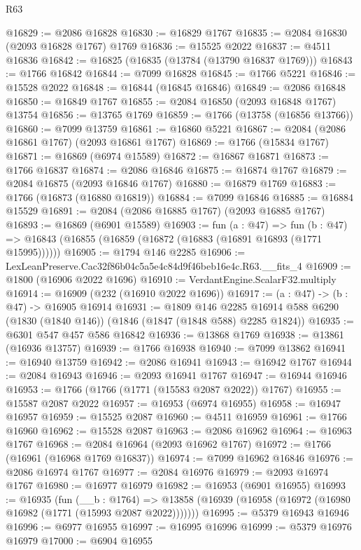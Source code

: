 \begin{lexlean}{R63}
\begin{coremodule}
@16829 := @2086 @16828
@16830 := @16829 @1767
@16835 := @2084 @16830 (@2093 @16828 @1767) @1769
@16836 := @15525 @2022
@16837 := @4511 @16836
@16842 := @16825 (@16835 (@13784 (@13790 @16837 @1769)))
@16843 := @1766 @16842
@16844 := @7099 @16828
@16845 := @1766 @5221
@16846 := @15528 @2022
@16848 := @16844 (@16845 @16846)
@16849 := @2086 @16848
@16850 := @16849 @1767
@16855 := @2084 @16850 (@2093 @16848 @1767) @13754
@16856 := @13765 @1769
@16859 := @1766 (@13758 (@16856 @13766))
@16860 := @7099 @13759
@16861 := @16860 @5221
@16867 := @2084 (@2086 @16861 @1767) (@2093 @16861 @1767)
@16869 := @1766 (@15834 @1767)
@16871 := @16869 (@6974 @15589)
@16872 := @16867 @16871
@16873 := @1766 @16837
@16874 := @2086 @16846
@16875 := @16874 @1767
@16879 := @2084 @16875 (@2093 @16846 @1767)
@16880 := @16879 @1769
@16883 := @1766 (@16873 (@16880 @16819))
@16884 := @7099 @16846
@16885 := @16884 @15529
@16891 := @2084 (@2086 @16885 @1767) (@2093 @16885 @1767)
@16893 := @16869 (@6901 @15589)
@16903 := fun (a : @47) =>
  fun (b : @47) => @16843 (@16855 (@16859 (@16872 (@16883 (@16891 @16893 (@1771 @15995))))))
@16905 := @1794 @146 @2285
@16906 := LexLeanPreserve.Cac32f86b04c5a5e4c84d9f46beb16e4c.R63.__fits_4
@16909 := @1800 (@16906 @2022 @1696)
@16910 := VerdantEngine.ScalarF32.multiply
@16914 := @16909 (@232 (@16910 @2022 @1696))
@16917 := (a : @47) -> (b : @47) -> @16905 @16914
@16931 := @1809
    @146
    @2285
    @16914
    @588
    @6290
    (@1830 (@1840 @146))
    (@1846 (@1847 (@1848 @588) @2285 @1824))
@16935 := @6301 @547 @457 @586 @16842
@16936 := @13868 @1769
@16938 := @13861 (@16936 @13757)
@16939 := @1766 @16938
@16940 := @7099 @13862
@16941 := @16940 @13759
@16942 := @2086 @16941
@16943 := @16942 @1767
@16944 := @2084 @16943
@16946 := @2093 @16941 @1767
@16947 := @16944 @16946
@16953 := @1766 (@1766 (@1771 (@15583 @2087 @2022)) @1767)
@16955 := @15587 @2087 @2022
@16957 := @16953 (@6974 @16955)
@16958 := @16947 @16957
@16959 := @15525 @2087
@16960 := @4511 @16959
@16961 := @1766 @16960
@16962 := @15528 @2087
@16963 := @2086 @16962
@16964 := @16963 @1767
@16968 := @2084 @16964 (@2093 @16962 @1767)
@16972 := @1766 (@16961 (@16968 @1769 @16837))
@16974 := @7099 @16962 @16846
@16976 := @2086 @16974 @1767
@16977 := @2084 @16976
@16979 := @2093 @16974 @1767
@16980 := @16977 @16979
@16982 := @16953 (@6901 @16955)
@16993 := @16935
    (fun (__b : @1764) =>
    @13858 (@16939 (@16958 (@16972 (@16980 @16982 (@1771 (@15993 @2087 @2022)))))))
@16995 := @5379 @16943 @16946
@16996 := @6977 @16955
@16997 := @16995 @16996
@16999 := @5379 @16976 @16979
@17000 := @6904 @16955

\end{coremodule}
\end{lexlean}
